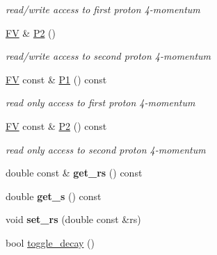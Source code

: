 \begin{DoxyCompactItemize}
\begin{DoxyCompactList}\small\item\em read/write access to first proton 4-\/momentum \end{DoxyCompactList}\item 
\hypertarget{classPS__2_a67fac165db2b49e4469787c6df78cb62}{\hyperlink{classFV}{F\-V} \& \hyperlink{classPS__2_a67fac165db2b49e4469787c6df78cb62}{P2} ()}\label{classPS__2_a67fac165db2b49e4469787c6df78cb62}

\begin{DoxyCompactList}\small\item\em read/write access to second proton 4-\/momentum \end{DoxyCompactList}\item 
\hypertarget{classPS__2_a772e6e3ed309f0afd1a4676b5cd2df92}{\hyperlink{classFV}{F\-V} const \& \hyperlink{classPS__2_a772e6e3ed309f0afd1a4676b5cd2df92}{P1} () const }\label{classPS__2_a772e6e3ed309f0afd1a4676b5cd2df92}

\begin{DoxyCompactList}\small\item\em read only access to first proton 4-\/momentum \end{DoxyCompactList}\item 
\hypertarget{classPS__2_aa9edfae86df81b545e27926fe7318e3e}{\hyperlink{classFV}{F\-V} const \& \hyperlink{classPS__2_aa9edfae86df81b545e27926fe7318e3e}{P2} () const }\label{classPS__2_aa9edfae86df81b545e27926fe7318e3e}

\begin{DoxyCompactList}\small\item\em read only access to second proton 4-\/momentum \end{DoxyCompactList}\item 
\hypertarget{classPS__2_a77b7be40d4f31c23a0bb0c112669c637}{double const \& {\bfseries get\-\_\-rs} () const }\label{classPS__2_a77b7be40d4f31c23a0bb0c112669c637}

\item 
\hypertarget{classPS__2_a3ef9ac96876f61f0c6a46a5321107bee}{double {\bfseries get\-\_\-s} () const }\label{classPS__2_a3ef9ac96876f61f0c6a46a5321107bee}

\item 
\hypertarget{classPS__2_a3b361fd3b41b8b92ab98e44dee130af8}{void {\bfseries set\-\_\-rs} (double const \&rs)}\label{classPS__2_a3b361fd3b41b8b92ab98e44dee130af8}

\item 
\hypertarget{classPS__2_a5063384c1c8b5e500f33970c01712f59}{bool \hyperlink{classPS__2_a5063384c1c8b5e500f33970c01712f59}{toggle\-\_\-decay} ()}\label{classPS__2_a5063384c1c8b5e500f33970c01712f59}


\end{DoxyCompactItemize}
